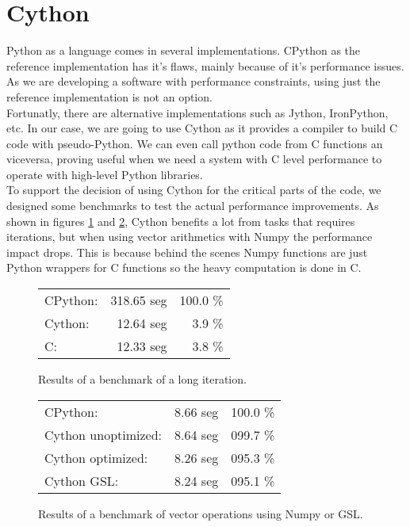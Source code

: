 \section{Cython}

Python as a language comes in several implementations. CPython as the reference
implementation has it's flaws, mainly because of it's performance issues. As we
are developing a software with performance constraints, using just the reference
implementation is not an option.\\

Fortunatly, there are alternative implementations such as Jython, IronPython,
etc. In our case, we are going to use Cython\cite{Cython}\cite{Cython_book} as
it provides a compiler to build C code with pseudo-Python. We can even call
python code from C functions an viceversa, proving useful when we need a system
with C level performance to operate with high-level Python libraries.\\

To support the decision of using Cython for the critical parts of the code,
we designed some benchmarks to test the actual performance improvements. As
shown in figures \ref{Cython:fig:1} and \ref{Cython:fig:2}, Cython benefits
a lot from tasks that requires iterations, but when using vector arithmetics
with Numpy the performance impact drops. This is because behind the scenes
Numpy functions are just Python wrappers for C functions so the heavy
computation is done in C.\\

\begin{figure}[ht!]
  \begin{center}
    \begin{tabular}{l r r}
      CPython:  & 318.65 seg & 100.0 \% \\
      Cython:   & 12.64 seg  & 3.9 \%   \\
      C:        & 12.33 seg  & 3.8 \%   \\
    \end{tabular}
  \end{center}
  \caption{Results of a benchmark of a long iteration.}
  \label{Cython:fig:1}
\end{figure}

\begin{figure}[ht!]
  \begin{center}
    \begin{tabular}{l r r}
      CPython:            & 8.66 seg & 100.0 \% \\
      Cython unoptimized: & 8.64 seg & 099.7 \% \\
      Cython optimized:   & 8.26 seg & 095.3 \% \\
      Cython GSL:         & 8.24 seg & 095.1 \%
    \end{tabular}
  \end{center}
  \caption{Results of a benchmark of vector operations using Numpy or GSL.}
  \label{Cython:fig:2}
\end{figure}


